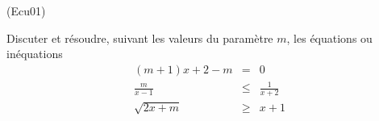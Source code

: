 \begin{tiny}(Ecu01)\end{tiny}\label{Ecu1}
Discuter et r{\'e}soudre, suivant les valeurs du param{\`e}tre $m$,
les {\'e}quations ou in{\'e}quations
\begin{eqnarray}
(m+1)x+2-m &=&0 \\
\frac{m}{x-1} &\leq &\frac{1}{x+2} \\
\sqrt{2x+m} &\geq &x+1
\end{eqnarray}